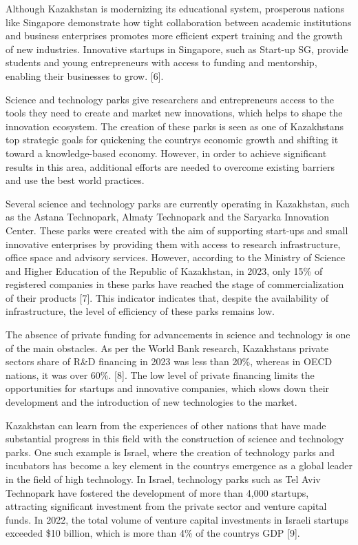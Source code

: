 Although Kazakhstan is modernizing its educational system, prosperous
nations like Singapore demonstrate how tight collaboration between
academic institutions and business enterprises promotes more efficient
expert training and the growth of new industries. Innovative startups in
Singapore, such as Start-up SG, provide students and young entrepreneurs
with access to funding and mentorship, enabling their businesses to
grow. {[}6{]}.

Science and technology parks give researchers and entrepreneurs access
to the tools they need to create and market new innovations, which helps
to shape the innovation ecosystem. The creation of these parks is seen
as one of Kazakhstan\textquotesingle s top strategic goals for
quickening the country\textquotesingle s economic growth and shifting it
toward a knowledge-based economy. However, in order to achieve
significant results in this area, additional efforts are needed to
overcome existing barriers and use the best world practices.

Several science and technology parks are currently operating in
Kazakhstan, such as the Astana Technopark, Almaty Technopark and the
Saryarka Innovation Center. These parks were created with the aim of
supporting start-ups and small innovative enterprises by providing them
with access to research infrastructure, office space and advisory
services. However, according to the Ministry of Science and Higher
Education of the Republic of Kazakhstan, in 2023, only 15\% of
registered companies in these parks have reached the stage of
commercialization of their products {[}7{]}. This indicator indicates
that, despite the availability of infrastructure, the level of
efficiency of these parks remains low.

The absence of private funding for advancements in science and
technology is one of the main obstacles. As per the World Bank research,
Kazakhstan\textquotesingle s private sector\textquotesingle s share of
R\&D financing in 2023 was less than 20\%, whereas in OECD nations, it
was over 60\%. {[}8{]}. The low level of private financing limits the
opportunities for startups and innovative companies, which slows down
their development and the introduction of new technologies to the
market.

Kazakhstan can learn from the experiences of other nations that have
made substantial progress in this field with the construction of science
and technology parks. One such example is Israel, where the creation of
technology parks and incubators has become a key element in the
country\textquotesingle s emergence as a global leader in the field of
high technology. In Israel, technology parks such as Tel Aviv Technopark
have fostered the development of more than 4,000 startups, attracting
significant investment from the private sector and venture capital
funds. In 2022, the total volume of venture capital investments in
Israeli startups exceeded \$10 billion, which is more than 4\% of the
country\textquotesingle s GDP {[}9{]}.

